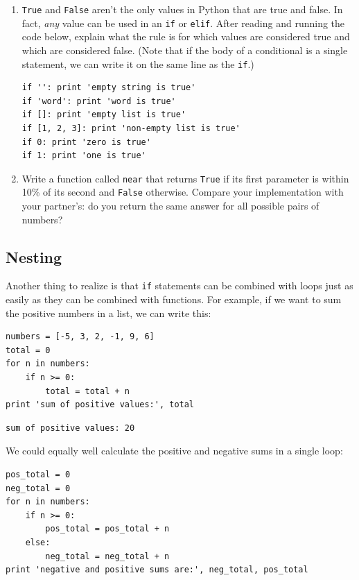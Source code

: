 \documentclass[]{book}
\begin{document}
\begin{enumerate}
\item
  \texttt{True} and \texttt{False} aren't the only values in Python that
  are true and false. In fact, \emph{any} value can be used in an
  \texttt{if} or \texttt{elif}. After reading and running the code
  below, explain what the rule is for which values are considered true
  and which are considered false. (Note that if the body of a
  conditional is a single statement, we can write it on the same line as
  the \texttt{if}.)

\begin{verbatim}
if '': print 'empty string is true'
if 'word': print 'word is true'
if []: print 'empty list is true'
if [1, 2, 3]: print 'non-empty list is true'
if 0: print 'zero is true'
if 1: print 'one is true'
\end{verbatim}
\item
  Write a function called \texttt{near} that returns \texttt{True} if
  its first parameter is within 10\% of its second and \texttt{False}
  otherwise. Compare your implementation with your partner's: do you
  return the same answer for all possible pairs of numbers?
\end{enumerate}

\subsection{Nesting}

Another thing to realize is that \texttt{if} statements can be combined
with loops just as easily as they can be combined with functions. For
example, if we want to sum the positive numbers in a list, we can write
this:

\begin{verbatim}
numbers = [-5, 3, 2, -1, 9, 6]
total = 0
for n in numbers:
    if n >= 0:
        total = total + n
print 'sum of positive values:', total
\end{verbatim}

\begin{verbatim}
sum of positive values: 20
\end{verbatim}

We could equally well calculate the positive and negative sums in a
single loop:

\begin{verbatim}
pos_total = 0
neg_total = 0
for n in numbers:
    if n >= 0:
        pos_total = pos_total + n
    else:
        neg_total = neg_total + n
print 'negative and positive sums are:', neg_total, pos_total
\end{verbatim}
\end{document}
